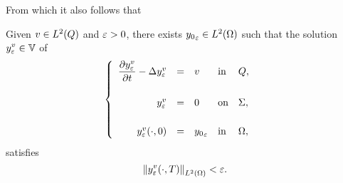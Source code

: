 From which it also follows that

\begin{corollaire}\label{coro:controllability-result-3}%
    Given $v\in L^{2}\!\left({Q}\right)$ and $\varepsilon > 0$, there exists ${y_{0}}_{\varepsilon}\in
    L^{2}\!\left({\Omega}\right)$ such that the solution $\displaystyle y_{\varepsilon}^{v}\in
    \mathbb{V}$ of
    \begin{equation}\label{eq:controllability-result-5}
        \begin{cases}\displaystyle
            \begin{array}{rclll}
                \dfrac{\partial{}y_{\varepsilon}^{v}}{\partial{}t} - \Delta y_{\varepsilon}^{v} & = & v &
                \text{in} & Q,\\
                \\
                y_{\varepsilon}^{v} & = & 0 & \text{on} & \Sigma,\\
                \\
                y_{\varepsilon}^{v}\!\left({\cdot,0}\right) & = & {y_{0}}_{\varepsilon}
                & \text{in} & \Omega,
            \end{array}
        \end{cases}
    \end{equation}
    satisfies
    \begin{equation*}\label{eq:controllability-result-6}
        {\left\|{y_{\varepsilon}^{v}\!\left({\cdot,T}\right) }\right\|}_{L^{2}\left({\Omega}\right)} < \varepsilon.
    \end{equation*}
\end{corollaire}

